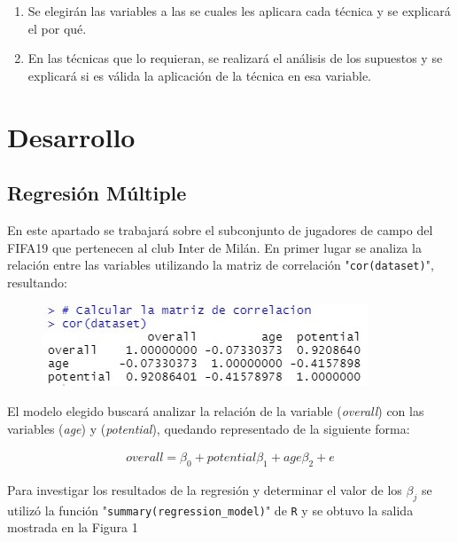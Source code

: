 \documentclass[a4paper,10pt,twocolumn]{article}
\begin{document}
\begin{enumerate}
	\item Se elegirán las variables a las se cuales les aplicara cada técnica y se explicará el por qué.
	\item En las técnicas que lo requieran,  se realizará el análisis de los supuestos y se explicará si es válida la aplicación de la técnica en esa variable.
\end{enumerate}


\section*{Desarrollo}\label{sec:dev}
  
\subsection*{Regresión Múltiple}

En este apartado se trabajará sobre el subconjunto de jugadores de campo del FIFA19 que pertenecen al club Inter de Milán.
En primer lugar se analiza la relación entre las variables utilizando la matriz de correlación "\verb|cor(dataset)|", resultando:

\begin{figure}[h]
	\includegraphics[scale=0.86]{./imgs/reg_correlation.jpg}
\end{figure}

El modelo elegido buscará analizar la relación de la variable (\textit{overall}) con las variables (\textit{age}) y (\textit{potential}), quedando representado de la siguiente forma:

\begin{align*}
overall = \beta_0 + potential \beta_1 + age \beta_2 + e
\end{align*}

Para investigar los resultados de la regresión y determinar el valor de los $\beta_j$ se utilizó la función "\verb|summary(regression_model)|" de \verb|R| y se obtuvo la salida mostrada en la Figura 1\\
\end{document}
